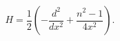 \begin{equation}
H=\frac{1}{2}\left(-\frac{d^2}{dx^2}+\frac{n^2-1}{4x^2}
\right).
\label{hbos}
\end{equation}

